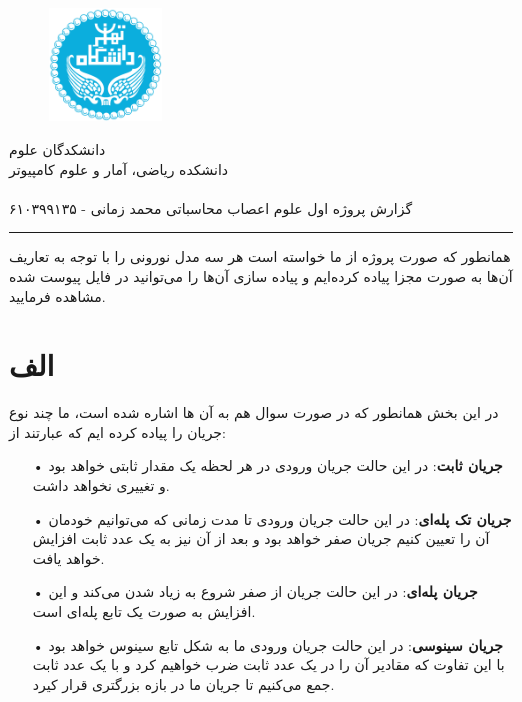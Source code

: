\documentclass[12pt]{extreport}
\theoremstyle{definition}
\begin{document}
	\begin{figure}
		\centering \includegraphics[height=3cm]{Logo.png}
	\end{figure}
	\begin{center}
دانشکدگان علوم
		\\
دانشکده ریاضی، آمار و علوم کامپیوتر
		\\
		
		\\
گزارش پروژه اول علوم اعصاب محاسباتی
		\qquad\qquad\qquad\quad
		\qquad\qquad\qquad\quad
محمد زمانی - ۶۱۰۳۹۹۱۳۵
		\par\noindent\rule{\textwidth}{0.4pt}
	\end{center}
	
	همانطور که صورت پروژه از ما خواسته است هر سه مدل نورونی را با توجه به تعاریف آن‌ها به صورت مجزا پیاده کرده‌ایم و پیاده سازی آن‌ها را می‌توانید در فایل پیوست شده مشاهده فرمایید.
	
\section*{الف}

	 در این بخش همانطور که در صورت سوال هم به آن ها اشاره شده است، ما چند نوع جریان را پیاده کرده ایم که عبارتند از:
	 \begin{itemize}
	 \item[•] \textbf{جریان ثابت}: در این حالت جریان ورودی در هر لحظه یک مقدار ثابتی خواهد بود و تغییری نخواهد داشت.
	 \item[•] \textbf{جریان تک پله‌ای}: در این حالت جریان ورودی تا مدت زمانی که می‌توانیم خودمان آن را تعیین کنیم جریان صفر خواهد بود و بعد از آن نیز به یک عدد ثابت افزایش خواهد یافت.
	 \item[•] \textbf{جریان پله‌ای}: در این حالت جریان از صفر شروع به زیاد شدن می‌کند و این افزایش به صورت یک تابع پله‌ای است.
	 \item[•] \textbf{جریان سینوسی}: در این حالت جریان ورودی ما به شکل تابع سینوس خواهد بود با این تفاوت که مقادیر آن را در یک عدد ثابت ضرب خواهیم کرد و با یک عدد ثابت جمع می‌کنیم تا جریان ما در بازه بزرگتری قرار کیرد.
	 \end{itemize}
	 
\end{document}
